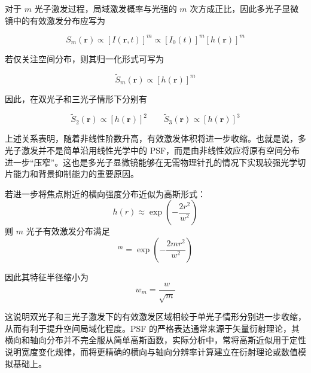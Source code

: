 对于 $m$ 光子激发过程，局域激发概率与光强的 $m$ 次方成正比，因此多光子显微镜中的有效激发分布应写为

\begin{equation}
  S_{m}(\mathbf{r})\propto [I(\mathbf{r},t)]^{m}
  \propto [I_{0}(t)]^{m}[h(\mathbf{r})]^{m}
  \label{eq:multiphoton_psf}
\end{equation}

若仅关注空间分布，则其归一化形式可写为

\begin{equation}
  \widetilde{S}_{m}(\mathbf{r})\propto [h(\mathbf{r})]^{m}
  \label{eq:effective_psf}
\end{equation}

因此，在双光子和三光子情形下分别有

\begin{equation}
\widetilde{S}_{2}(\mathbf{r})\propto [h(\mathbf{r})]^2\qquad
\widetilde{S}_{3}(\mathbf{r})\propto [h(\mathbf{r})]^3
\end{equation}

上述关系表明，随着非线性阶数升高，有效激发体积将进一步收缩。也就是说，多光子激发并不是简单沿用线性光学中的 PSF，而是由非线性效应将原有空间分布进一步``压窄''。这也是多光子显微镜能够在无需物理针孔的情况下实现较强光学切片能力和背景抑制能力的重要原因。

若进一步将焦点附近的横向强度分布近似为高斯形式：
\begin{equation}
  h(r)\approx \exp\!\left(-\frac{2r^2}{w^2}\right)
  \label{eq:gaussian_psf}
  \end{equation}
  则 $m$ 光子有效激发分布满足
  \begin{equation}
  [h(r)]^m=\exp\!\left(-\frac{2mr^2}{w^2}\right)
  \end{equation}

因此其特征半径缩小为
  \begin{equation}
  w_m=\frac{w}{\sqrt{m}}
  \label{eq:wm_scaling}
\end{equation}

这说明双光子和三光子激发下的有效激发区域相较于单光子情形分别进一步收缩，从而有利于提升空间局域化程度。PSF 的严格表达通常来源于矢量衍射理论，其横向和轴向分布并不完全服从简单高斯函数，实际分析中，常将高斯近似用于定性说明宽度变化规律，而将更精确的横向与轴向分辨率计算建立在衍射理论或数值模拟基础上。

